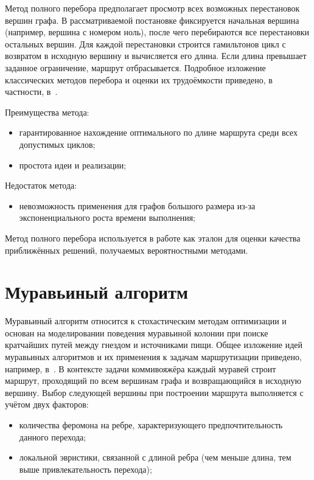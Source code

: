Метод полного перебора предполагает просмотр всех возможных перестановок вершин графа. В рассматриваемой постановке фиксируется начальная вершина (например, вершина с номером ноль), после чего перебираются все перестановки остальных вершин. Для каждой перестановки строится гамильтонов цикл с возвратом в исходную вершину и вычисляется его длина. Если длина превышает заданное ограничение, маршрут отбрасывается. Подробное изложение классических методов перебора и оценки их трудоёмкости приведено, в частности, в~\cite{malyshev}.

Преимущества метода:
\begin{itemize}
	\item гарантированное нахождение оптимального по длине маршрута среди всех допустимых циклов;
	\item простота идеи и реализации;
\end{itemize}

Недостаток метода:
\begin{itemize}
	\item невозможность применения для графов большого размера из-за экспоненциального роста времени выполнения;
\end{itemize}

Метод полного перебора используется в работе как эталон для оценки качества приближённых решений, получаемых вероятностными методами.

\section{Муравьиный алгоритм}

Муравьиный алгоритм относится к стохастическим методам оптимизации и основан на моделировании поведения муравьиной колонии при поиске кратчайших путей между гнездом и источниками пищи. Общее изложение идей муравьиных алгоритмов и их применения к задачам маршрутизации приведено, например, в~\cite{dorigo}. В контексте задачи коммивояжёра каждый муравей строит маршрут, проходящий по всем вершинам графа и возвращающийся в исходную вершину. Выбор следующей вершины при построении маршрута выполняется с учётом двух факторов:
\begin{itemize}
	\item количества феромона на ребре, характеризующего предпочтительность данного перехода;
	\item локальной эвристики, связанной с длиной ребра (чем меньше длина, тем выше привлекательность перехода);
\end{itemize}

